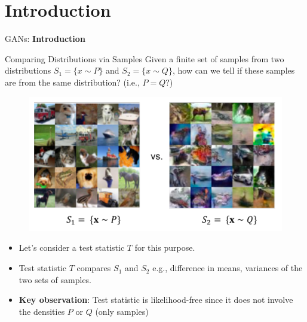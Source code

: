 \section{Introduction}
\begin{frame}{}
    \LARGE GANs: \textbf{Introduction}
\end{frame}

\begin{frame}[allowframebreaks]{Comparing Distributions via Samples}
Given a finite set of samples from two distributions $S_1 = \{x \sim P\}$ and $S_2 = \{x \sim Q\}$, how can we tell if these samples are from the same distribution? (i.e., $P = Q$?)
\begin{figure}
    \centering
    \includegraphics[height=0.58\textheight, width=\textwidth, keepaspectratio]{images/gan/gan_two_dist.png}
\end{figure}

\begin{minipage}{\textwidth}
\end{minipage}

\framebreak

\begin{itemize}
    \item Let's consider a test statistic $T$ for this purpose.
    \item Test statistic $T$ compares $S_1$ and $S_2$ e.g., difference in means, variances of the two sets of samples.
    \item \textbf{Key observation}: Test statistic is likelihood-free since it does not involve the densities $P$ or $Q$ (only samples)
\end{itemize}
\end{frame}